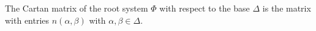 The Cartan matrix of the root system $\Phi$ with respect to the base $\Delta$
is the matrix with entries $n(\alpha, \beta)$ with $\alpha, \beta \in \Delta$.
